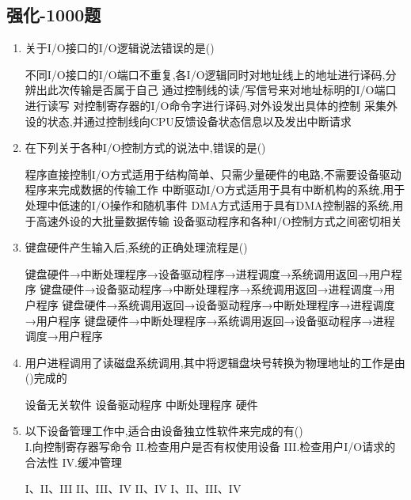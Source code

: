\documentclass[12pt, a4paper, oneside, UTF8]{ctexbook}
\begin{document}
\subsection{强化-1000题}
\begin{enumerate}
    \item 关于I/O接口的I/O逻辑说法错误的是(\qquad)
    \begin{choices}[1]
    \task 不同I/O接口的I/O端口不重复,各I/O逻辑同时对地址线上的地址进行译码,分辨出此次传输是否属于自己
    \task 通过控制线的读/写信号来对地址标明的I/O端口进行读写
    \task 对控制寄存器的I/O命令字进行译码,对外设发出具体的控制
    \task 采集外设的状态,并通过控制线向CPU反馈设备状态信息以及发出中断请求
    \end{choices}

    \item 在下列关于各种I/O控制方式的说法中,错误的是(\qquad)
    \begin{choices}[1]
    \task 程序直接控制I/O方式适用于结构简单、只需少量硬件的电路,不需要设备驱动程序来完成数据的传输工作
    \task 中断驱动I/O方式适用于具有中断机构的系统,用于处理中低速的I/O操作和随机事件
    \task DMA方式适用于具有DMA控制器的系统,用于高速外设的大批量数据传输
    \task 设备驱动程序和各种I/O控制方式之间密切相关
    \end{choices}

    \item 键盘硬件产生输入后,系统的正确处理流程是(\qquad)
    \begin{choices}[1]
    \task 键盘硬件→中断处理程序→设备驱动程序→进程调度→系统调用返回→用户程序
    \task 键盘硬件→设备驱动程序→中断处理程序→系统调用返回→进程调度→用户程序
    \task 键盘硬件→系统调用返回→设备驱动程序→中断处理程序→进程调度→用户程序
    \task 键盘硬件→中断处理程序→系统调用返回→设备驱动程序→进程调度→用户程序
    \end{choices}

    \item 用户进程调用了读磁盘系统调用,其中将逻辑盘块号转换为物理地址的工作是由(\qquad)完成的
    \begin{choices}
    \task 设备无关软件
    \task 设备驱动程序
    \task 中断处理程序
    \task 硬件
    \end{choices}

    \item 以下设备管理工作中,适合由设备独立性软件来完成的有(\qquad)\\
    I.向控制寄存器写命令\quad
    II.检查用户是否有权使用设备\quad
    III.检查用户I/O请求的合法性\quad
    IV.缓冲管理
    \begin{choices}[2]
    \task I、II、III
    \task II、III、IV
    \task II、IV
    \task I、II、III、IV
    \end{choices}


\end{enumerate}
\end{document}
